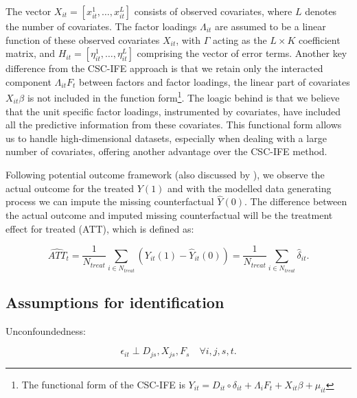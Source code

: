 \documentclass[12pt]{article}
\begin{document}
The vector $X_{it} = [x_{it}^1, \ldots, x_{it}^L]$ consists of observed covariates, where $L$ denotes the number of covariates. The factor loadings $\Lambda_{it}$ are assumed to be a linear function of these observed covariates $X_{it}$, with $\Gamma$ acting as the $L\times K$ coefficient matrix, and $H_{it} = [\eta_{it}^1, \ldots, \eta_{it}^L]$ comprising the vector of error terms. Another key difference from the CSC-IFE approach is that we retain only the interacted component $\Lambda_{it} F_t$ between factors and factor loadings, the linear part of covariates $X_{it}\beta$ is not included in the function form\footnote{The functional form of the CSC-IFE is $Y_{it} = D_{it} \circ \delta_{it} + \Lambda_{i}F_{t} + X_{it}\beta + \mu_{it}$}. The loagic behind is that we believe that the unit specific factor loadings, instrumented by covariates, have included all the predictive information from these covariates. This functional form allows us to handle high-dimensional datasets, especially when dealing with a large number of covariates, offering another advantage over the CSC-IFE method.

Following \cite{splawa1990application} potential outcome framework (also discussed by \cite{rubin1974estimating, rubin2005causal}), we observe the actual outcome for the treated $Y(1)$ and with the modelled data generating process we can impute the missing counterfactual $\hat{Y}(0)$. The difference between the actual outcome and imputed missing counterfactual will be the treatment effect for treated (ATT), which is defined as:

\begin{equation}
\widehat{ATT}_{t} = \frac{1}{N_{treat}}\sum_{i \in N_{treat}} \left( Y_{it}(1) - \hat{Y}_{it}(0) \right) = \frac{1}{N_{treat}}\sum_{i \in N_{treat}}\hat{\delta}_{it}.
\end{equation}
\subsection{Assumptions for identification}

\begin{assumption}
Unconfoundedness:
\label{ass: unconfoundedess} 
\end{assumption}

\begin{equation}
\epsilon_{it} \perp D_{js}, X_{js}, F_s \quad \forall i, j, s, t.
\label{eq: unconfoundedess}
\end{equation}
\end{document}
